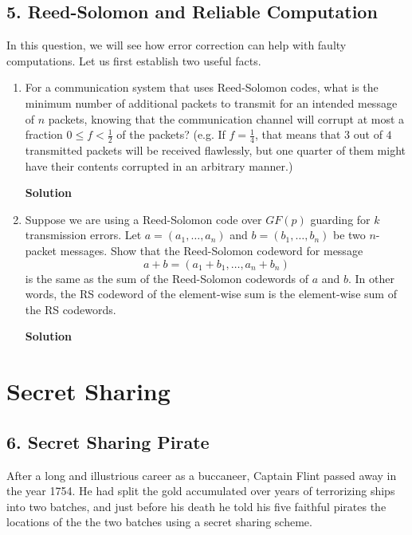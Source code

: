 \documentclass{article}\usepackage{amsmath,amssymb,amsthm,tikz,tkz-graph,color,chngpage,soul,hyperref,csquotes,graphicx,floatrow}\newcommand*{\QEDB}{\hfill\ensuremath{\square}}\newtheorem*{prop}{Proposition}\renewcommand{\theenumi}{\alph{enumi}}\usepackage[shortlabels]{enumitem}\usepackage[nobreak=true]{mdframed}\usetikzlibrary{matrix,calc}\MakeOuterQuote{"}\usepackage[margin=0.75in]{geometry} \newtheorem{theorem}{Theorem}
\begin{document}
\subsection*{5. Reed-Solomon and Reliable Computation}
In this question, we will see how error correction can help with faulty computations. Let us first establish two useful facts.
\begin{enumerate}
\item For a communication system that uses Reed-Solomon codes, what is the minimum number of additional packets to transmit for an intended message of $n$ packets, knowing that the communication channel will corrupt at most a fraction $0\leqslant f<\frac{1}{2}$ of the packets? (e.g. If $f=\frac 14$, that means that $3$ out of $4$ transmitted packets will be received flawlessly, but one quarter of them might have their contents corrupted in an arbitrary manner.)
\begin{mdframed}
\textbf{Solution}

\end{mdframed}
\item Suppose we are using a Reed-Solomon code over $GF(p)$ guarding for $k$ transmission errors. Let $a=(a_1,\ldots,a_n)$ and $b=(b_1,\ldots,b_n)$ be two $n$-packet messages. Show that the Reed-Solomon codeword for message $$a+b=(a_1+b_1,\ldots,a_n+b_n)$$ is the same as the sum of the Reed-Solomon codewords of $a$ and $b$. In other words, the RS codeword of the element-wise sum is the element-wise sum of the RS codewords.
\begin{mdframed}
\textbf{Solution}

\end{mdframed}
\end{enumerate}
\clearpage

\section*{Secret Sharing}

\subsection*{6. Secret Sharing Pirate}
After a long and illustrious career as a buccaneer, Captain Flint passed away in the year 1754. He had split the gold accumulated over years of terrorizing ships into two batches, and just before his death he told his five faithful pirates the locations of the the two batches using a secret sharing scheme.
\end{document}
